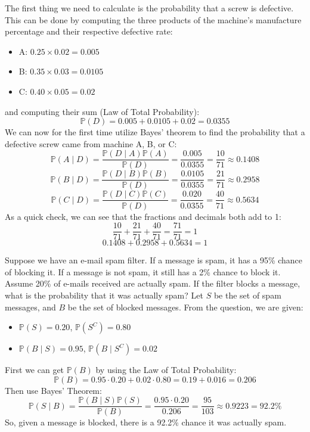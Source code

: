 \documentclass{jhwhw}
\begin{document}
        The first thing we need to calculate is the probability that a screw is defective. This can be done by
        computing the three products of the machine's manufacture percentage and their respective defective rate:
        \begin{itemize}
            \item A: \(0.25 \times 0.02 = 0.005\)
            \item B: \(0.35 \times 0.03 = 0.0105\)
            \item C: \(0.40 \times 0.05 = 0.02\) 
        \end{itemize} 
        and computing their sum (Law of Total Probability):
        \[
            \mathbb{P}(D) = 0.005 + 0.0105 + 0.02 = 0.0355 
        \]
        We can now for the first time utilize Bayes' theorem to find the probability that a defective screw 
        came from machine A, B, or C:
        \[
            \mathbb{P}(A \mid D) = \frac{\mathbb{P}(D \mid A)\mathbb{P}(A)}{\mathbb{P}(D)} = \frac{0.005}{0.0355} = \frac{10}{71} \approx 0.1408
        \]
        \[
            \mathbb{P}(B \mid D) = \frac{\mathbb{P}(D \mid B)\mathbb{P}(B)}{\mathbb{P}(D)} = \frac{0.0105}{0.0355} = \frac{21}{71} \approx 0.2958
        \]
        \[
            \mathbb{P}(C \mid D) = \frac{\mathbb{P}(D \mid C)\mathbb{P}(C)}{\mathbb{P}(D)} = \frac{0.020}{0.0355} = \frac{40}{71} \approx 0.5634
        \]
        As a quick check, we can see that the fractions and decimals both add to 1:
        \[
            \frac{10}{71}+\frac{21}{71}+\frac{40}{71} = \frac{71}{71} = 1
        \]
        \[
            0.1408 + 0.2958 + 0.5634 = 1
        \]

    \problem{}
        Suppose we have an e-mail spam filter. If a message is spam, it has a 95\% chance of blocking
it. If a message is not spam, it still has a 2\% chance to block it. Assume 20\% of e-mails received
are actually spam. If the filter blocks a message, what is the probability that it was actually
spam?
    \solution
        Let \(S\) be the set of spam messages, and \(B\) be the set of blocked messages. From the question, we are given:
        \begin{itemize}
            \item \(\mathbb{P}(S) = 0.20\), \(\mathbb{P}(S^C)= 0.80\)
            \item \(\mathbb{P}(B \mid S) = 0.95\), \(\mathbb{P}(B \mid S^C)= 0.02\)  
        \end{itemize}
        First we can get \(\mathbb{P}(B)\) by using the Law of Total Probability:
        \[
            \mathbb{P}(B)  = 0.95 \cdot 0.20 + 0.02 \cdot 0.80 = 0.19 + 0.016 = 0.206
        \]
        Then use Bayes' Theorem:
        \[
            \mathbb{P}(S \mid B) = \frac{\mathbb{P}(B \mid S)\mathbb{P}(S)}{\mathbb{P}(B)} = \frac{0.95 \cdot 0.20}{0.206} = \frac{95}{103} \approx 0.9223 = 92.2\%
        \]
        So, given a message is blocked, there is a 92.2\% chance it was actually spam. 
\end{document}

